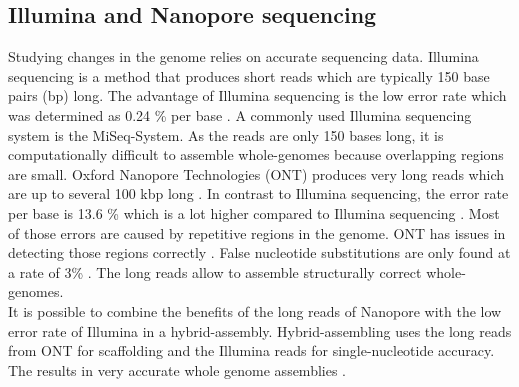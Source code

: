 \subsection{Illumina and Nanopore sequencing}
Studying changes in the genome relies on accurate sequencing data. Illumina sequencing is a method that produces short reads which are typically 150 base pairs (bp) long. The advantage of Illumina sequencing is the low error rate which was determined as 0.24 \% per base \cite{pfeiffer_systematic_2018}. A commonly used Illumina sequencing system is the MiSeq-System. As the reads are only 150 bases long, it is computationally difficult to assemble whole-genomes because overlapping regions are small.  
Oxford Nanopore Technologies (ONT) produces very long reads which are up to several 100 kbp long \cite{noauthor_resolving_nodate}. In contrast to Illumina sequencing, the error rate per base is 13.6 \% which is a lot higher compared to Illumina sequencing \cite{noauthor_resolving_nodate}. Most of those errors are caused by repetitive regions in the genome. ONT has issues in detecting those regions correctly \cite{noauthor_resolving_nodate}. False nucleotide substitutions are only found at a rate of 3\% \cite{noauthor_resolving_nodate}. The long reads allow to assemble structurally correct whole-genomes. \\
It is possible to combine the benefits of the long reads of Nanopore with the low error rate of Illumina in a hybrid-assembly. Hybrid-assembling uses the long reads from ONT for scaffolding and the Illumina reads for single-nucleotide accuracy. The results in very accurate whole genome assemblies \cite{noauthor_resolving_nodate}.

